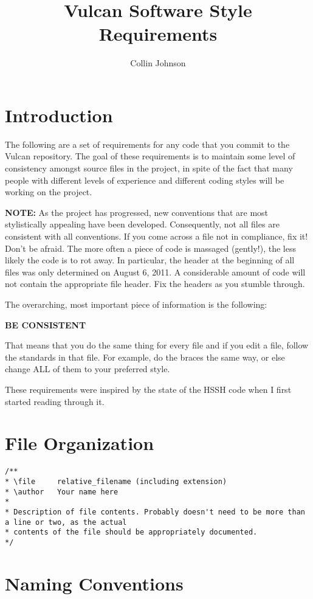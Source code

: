 \documentclass{article}
\title{Vulcan Software Style Requirements}
\author{Collin Johnson}
\begin{document}
\maketitle

\section{Introduction}
The following are a set of requirements for any code that you commit to the Vulcan repository. The goal of these requirements is to maintain some level of consistency amongst source files in the project, in spite of the fact that many people with different levels of experience and different coding styles will be working on the project.

\textbf{NOTE:} As the project has progressed, new conventions that are most stylistically appealing have been developed. Consequently, not all files are consistent with all conventions. If you come across a file not in compliance, fix it! Don't be afraid. The more often a piece of code is massaged (gently!), the less likely the code is to rot away. In particular, the header at the beginning of all files was only determined on August 6, 2011. A considerable amount of code will not contain the appropriate file header. Fix the headers as you stumble through.

The overarching, most important piece of information is the following:

\textbf{BE CONSISTENT}

That means that you do the same thing for every file and if you edit a file, follow the standards in that file. For example, do the braces the same way, or else change ALL of them to your preferred style.

These requirements were inspired by the state of the HSSH code when I first started reading through it.

\section{File Organization}
\begin{verbatim}
/**
* \file     relative_filename (including extension)
* \author   Your name here
*
* Description of file contents. Probably doesn't need to be more than a line or two, as the actual
* contents of the file should be appropriately documented.
*/
\end{verbatim}

\section{Naming Conventions}
\end{document}
